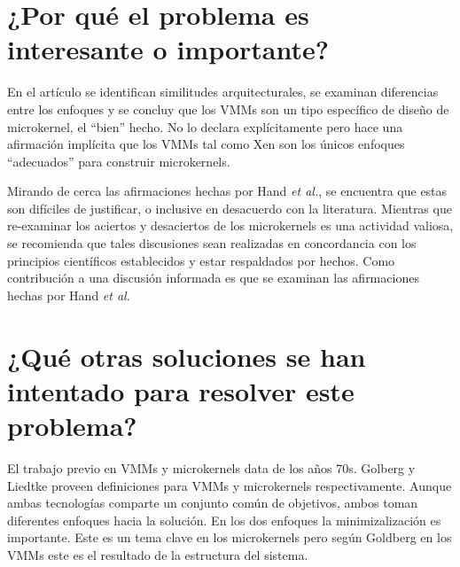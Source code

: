 \section{¿Por qué el problema es interesante o importante?}
En el artículo se identifican similitudes arquitecturales, se examinan diferencias entre los enfoques y se concluy que los VMMs son un tipo específico de diseño de microkernel, el ``bien'' hecho. No lo declara explícitamente pero hace una afirmación implícita que los VMMs tal como Xen son los únicos enfoques ``adecuados'' para construir microkernels. 

Mirando de cerca las afirmaciones hechas por Hand \emph{et al.}, se encuentra que estas son difíciles de justificar, o inclusive en desacuerdo con la literatura. Mientras que re-examinar los aciertos y desaciertos de los microkernels es una actividad valiosa, se recomienda que tales discusiones sean realizadas en concordancia con los principios científicos establecidos y estar respaldados por hechos. Como contribución a una discusión informada es que se examinan las afirmaciones hechas por Hand \emph{et al}. 

\section{¿Qué otras soluciones se han intentado para resolver este problema?}
El trabajo previo en VMMs y microkernels data de los años 70s. Golberg y Liedtke proveen definiciones para VMMs y microkernels respectivamente. Aunque ambas tecnologías comparte un conjunto común de objetivos, ambos toman diferentes enfoques hacia la solución. En los dos enfoques la minimizalización es importante. Este es un tema clave en los microkernels pero según Goldberg en los VMMs este es el resultado de la estructura del sistema.

